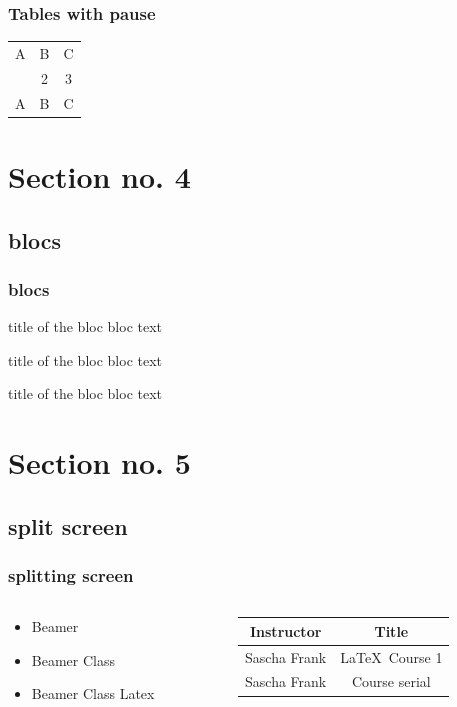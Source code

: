 \documentclass{beamer}
\begin{document}
\begin{frame}\frametitle{Tables with pause}
\begin{tabular}{c c c}
A & B & C \\ 
\pause 
1 & 2 & 3 \\  
\pause 
A & B & C \\ 
\end{tabular} 
\end{frame}


\section{Section no. 4}
\subsection{blocs}
\begin{frame}\frametitle{blocs}

\begin{block}{title of the bloc}
bloc text
\end{block}

\begin{exampleblock}{title of the bloc}
bloc text
\end{exampleblock}


\begin{alertblock}{title of the bloc}
bloc text
\end{alertblock}
\end{frame}

\section{Section no. 5}
\subsection{split screen}

\begin{frame}\frametitle{splitting screen}
\begin{columns}
\begin{column}{5cm}
\begin{itemize}
\item Beamer 
\item Beamer Class 
\item Beamer Class Latex 
\end{itemize}
\end{column}
\begin{column}{5cm}
\begin{tabular}{|c|c|}
\hline
\textbf{Instructor} & \textbf{Title} \\
\hline
Sascha Frank &  \LaTeX \ Course 1 \\
\hline
Sascha Frank &  Course serial  \\
\hline
\end{tabular}
\end{column}
\end{columns}
\end{frame}
\end{document}
